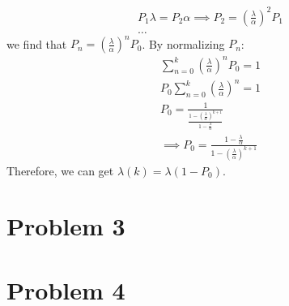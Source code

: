 \documentclass{article}
\begin{document}
\begin{enumerate}
\begin{gather*}
				P_{1} \lambda = P_{2} \alpha \implies P_{2} = \left(\frac{\lambda}{\alpha}\right)^2 P_{1} \\
				\ldots
			\end{gather*}
			we find that $P_{n}=\left(\frac{\lambda}{\alpha}\right)^n P_{0}$.
			By normalizing $P_{n}$:
			\begin{gather*}
				\sum\limits_{n=0}^{k} \left(\frac{\lambda}{\alpha}\right)^n P_{0} = 1 \\
				P_{0} \sum\limits_{n=0}^{k} \left(\frac{\lambda}{\alpha}\right)^n = 1 \\
				P_{0} = \frac{1}{\frac{1-(\frac{\lambda}{\alpha})^{k+1}}{1-\frac{\lambda}{\alpha}}} \\
				\implies P_{0} = \frac{1-\frac{\lambda}{\alpha}}{1-(\frac{\lambda}{\alpha})^{k+1}}
			\end{gather*}
			Therefore, we can get $\lambda(k)=\lambda(1-P_{0})$.
	\end{enumerate}

\section*{Problem 3}

\section*{Problem 4}
\end{document}

